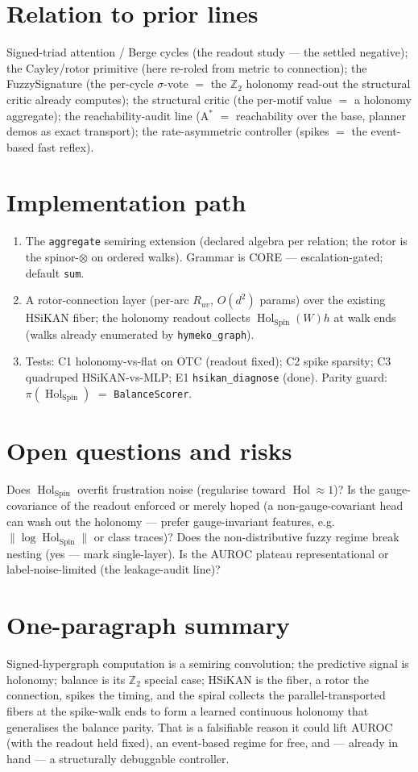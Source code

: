 \documentclass[11pt]{article}
\theoremstyle{definition}
\theoremstyle{plain}
\theoremstyle{remark}
\newcommand{\Hol}{\operatorname{Hol}}
\newcommand{\Spin}{\mathrm{Spin}}
\newcommand{\Z}{\mathbb{Z}}
\begin{document}
\section{Relation to prior lines}
Signed-triad attention / Berge cycles (the readout study --- the settled negative); the Cayley/rotor primitive
(here re-roled from metric to connection); the FuzzySignature (the per-cycle $\sigma$-vote $=$ the $\Z_2$
holonomy read-out the structural critic already computes); the structural critic (the per-motif value $=$ a
holonomy aggregate); the reachability-audit line (A$^\ast$ $=$ reachability over the base, planner demos as exact
transport); the rate-asymmetric controller (spikes $=$ the event-based fast reflex).

\section{Implementation path}
\begin{enumerate}[nosep,leftmargin=1.5em]
  \item The \texttt{aggregate} semiring extension (declared algebra per relation; the rotor is the spinor-$\otimes$
        on ordered walks). Grammar is CORE --- escalation-gated; default \texttt{sum}.
  \item A rotor-connection layer (per-arc $R_{uv}$, $O(d^2)$ params) over the existing HSiKAN fiber; the holonomy
        readout collects $\Hol_\Spin(W)h$ at walk ends (walks already enumerated by \texttt{hymeko\_graph}).
  \item Tests: C1 holonomy-vs-flat on OTC (readout fixed); C2 spike sparsity; C3 quadruped HSiKAN-vs-MLP; E1
        \texttt{hsikan\_diagnose} (done). Parity guard: $\pi(\Hol_\Spin)$ $=$ \texttt{BalanceScorer}.
\end{enumerate}

\section{Open questions and risks}
Does $\Hol_\Spin$ overfit frustration noise (regularise toward $\Hol\!\approx\!1$)? Is the gauge-covariance of the
readout enforced or merely hoped (a non-gauge-covariant head can wash out the holonomy --- prefer gauge-invariant
features, e.g.\ $\|\log\Hol_\Spin\|$ or class traces)? Does the non-distributive fuzzy regime break nesting (yes
--- mark single-layer). Is the AUROC plateau representational or label-noise-limited (the leakage-audit line)?

\section*{One-paragraph summary}
Signed-hypergraph computation is a semiring convolution; the predictive signal is holonomy; balance is its $\Z_2$
special case; HSiKAN is the fiber, a rotor the connection, spikes the timing, and the spiral collects the
parallel-transported fibers at the spike-walk ends to form a learned continuous holonomy that generalises the
balance parity. That is a falsifiable reason it could lift AUROC (with the readout held fixed), an event-based
regime for free, and --- already in hand --- a structurally debuggable controller.
\end{document}
